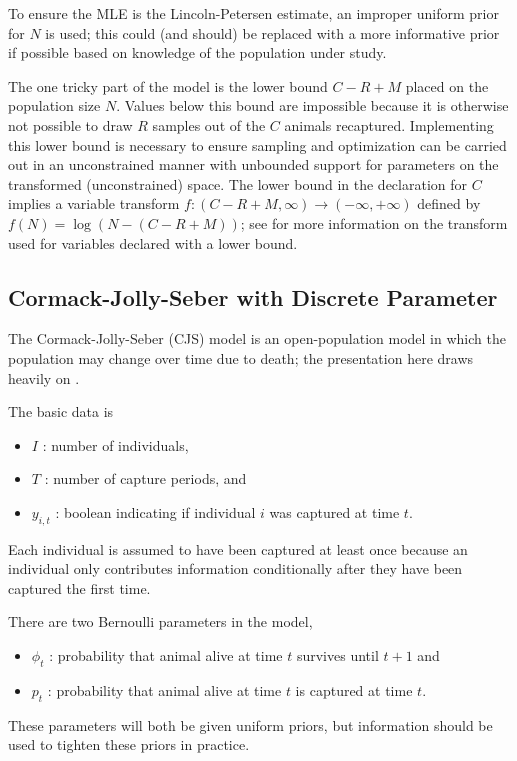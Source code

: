 To ensure the MLE is the Lincoln-Petersen estimate, an improper
uniform prior for $N$ is used; this could (and should) be replaced
with a more informative prior if possible based on knowledge of the
population under study.

The one tricky part of the model is the lower bound $C - R + M$ placed
on the population size $N$.  Values below this bound are impossible
because it is otherwise not possible to draw $R$ samples out of the
$C$ animals recaptured.  Implementing this lower bound is necessary to
ensure sampling and optimization can be carried out in an
unconstrained manner with unbounded support for parameters on the
transformed (unconstrained) space.  The lower bound in the declaration
for $C$ implies a variable transform $f : (C-R+M,\infty) \rightarrow
(-\infty,+\infty)$ defined by $f(N) = \log(N - (C - R + M))$; see
 for more information on the
transform used for variables declared with a lower bound.

\subsection{Cormack-Jolly-Seber with Discrete Parameter}

The Cormack-Jolly-Seber (CJS) model
\citep{Cormack:1964,Jolly:1965,Seber:1965} is an open-population model
in which the population may change over time due to death; the
presentation here draws heavily on \citep{Schofield:2007}.

The basic data is
%
\begin{itemize}
\item $I$ : number of individuals,
\item $T$ : number of capture periods, and
\item $y_{i,t}$ : boolean indicating if individual $i$ was captured at
  time $t$.
\end{itemize}
%
Each individual is assumed to have been captured at least once because
an individual only contributes information conditionally after they
have been captured the first time.

There are two Bernoulli parameters in the model,
%
\begin{itemize}
\item $\phi_t$ : probability that animal alive at time $t$ survives
  until $t + 1$ and
\item $p_t$ : probability that animal alive at time $t$ is captured at
  time $t$.
\end{itemize}
%
These parameters will both be given uniform priors, but information
should be used to tighten these priors in practice.

